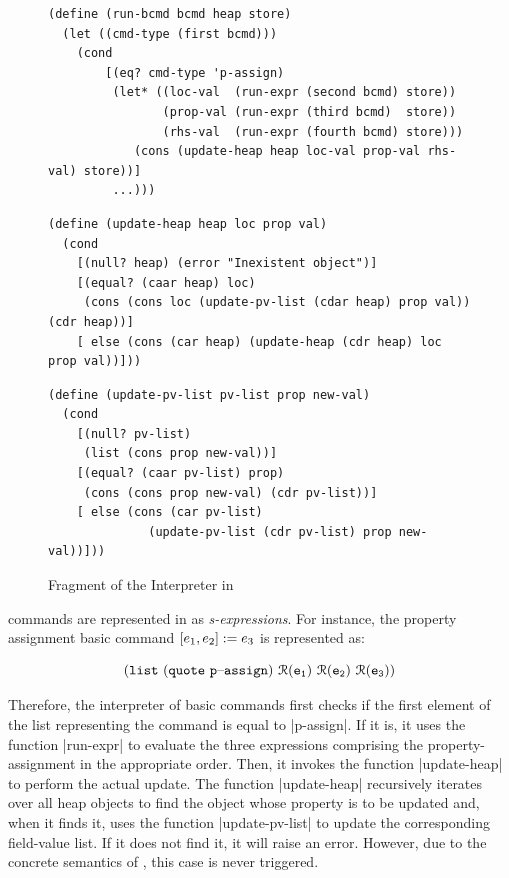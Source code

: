 \begin{figure}[t!]
\centering
\begin{lstlisting}
(define (run-bcmd bcmd heap store)
  (let ((cmd-type (first bcmd)))
    (cond
    	[(eq? cmd-type 'p-assign)
      	 (let* ((loc-val  (run-expr (second bcmd) store))
                (prop-val (run-expr (third bcmd)  store))
                (rhs-val  (run-expr (fourth bcmd) store)))
            (cons (update-heap heap loc-val prop-val rhs-val) store))]
         ...)))
\end{lstlisting}

\begin{lstlisting}
(define (update-heap heap loc prop val)
  (cond
    [(null? heap) (error "Inexistent object")]
    [(equal? (caar heap) loc)
     (cons (cons loc (update-pv-list (cdar heap) prop val)) (cdr heap))]
    [ else (cons (car heap) (update-heap (cdr heap) loc prop val))]))
\end{lstlisting}

\begin{lstlisting}         
(define (update-pv-list pv-list prop new-val)
  (cond
    [(null? pv-list)
     (list (cons prop new-val))]
    [(equal? (caar pv-list) prop)
     (cons (cons prop new-val) (cdr pv-list))]
    [ else (cons (car pv-list) 
              (update-pv-list (cdr pv-list) prop new-val))]))
\end{lstlisting}
\vspace*{-0.3cm}
\caption{Fragment of the \jsil Interpreter in \rosette\label{rosette:interpreter:fragment}}
\vspace*{-0.5cm}
\end{figure}

\jsil commands are represented in \rosette as \emph{s-expressions}. 
 For instance, the property assignment basic command $[e_1, e_2] := e_3$
 is represented as: 

\vspace*{-0.2cm}
{\small $$
\mathtt{(list \ (quote\ {p\text{--}assign}) \ \roscomp{\jsilexpr_1} \ \roscomp{\jsilexpr_2} \ \roscomp{\jsilexpr_3})}
$$}
\vspace*{-0.4cm}

\noindent Therefore, the interpreter of basic commands first checks if the first element of the 
list representing the command is equal to \schemeinline|p-assign|. If it is, 
it uses the function \schemeinline|run-expr| to evaluate the three \jsil expressions 
comprising the property-assignment in the appropriate order. Then, it invokes the 
function \schemeinline|update-heap| to perform the actual update. 
The function \schemeinline|update-heap| recursively iterates over all heap objects
to find the object whose property is to be updated and, when it finds it, 
uses the function \schemeinline|update-pv-list| to update the corresponding 
field-value list. If it does not find it, it will raise an error. However, due to the concrete semantics of \jsil, this case is never triggered.

